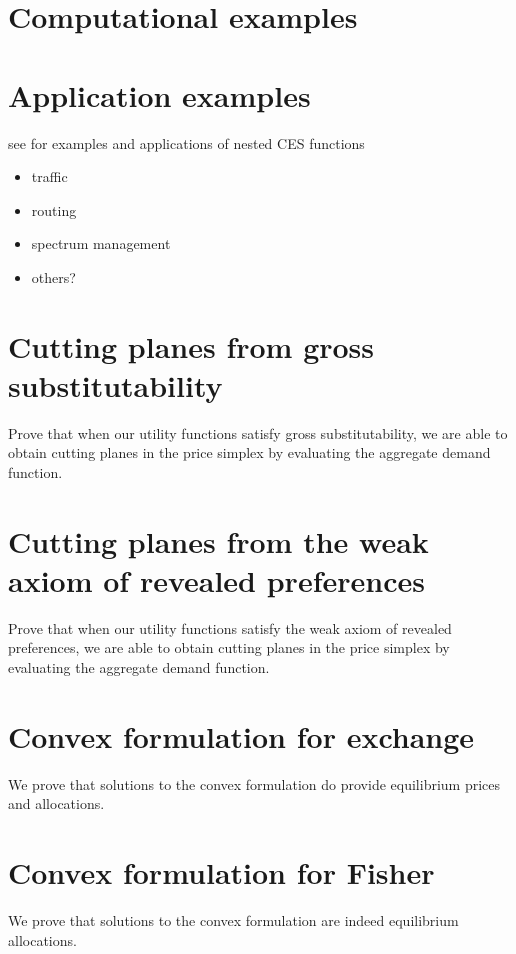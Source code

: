 \documentclass[12pt]{article}
\begin{document}
\section{Computational examples}

\section{Application examples}
\cite{shoven1992applying}

see \cite{shoven1992applying} for examples and applications of nested CES functions

\begin{itemize}
\item traffic
\item routing
\item spectrum management
\item others?
\end{itemize}

\appendix
\section{Cutting planes from gross substitutability}
Prove that when our utility functions satisfy gross substitutability,
we are able to obtain cutting
planes in the price simplex by evaluating the aggregate demand function.

\section{Cutting planes from the weak axiom of revealed preferences}
Prove that when our utility functions satisfy the
weak axiom of revealed preferences, we are able to obtain cutting
planes in the price simplex by evaluating the aggregate demand function.

\section{Convex formulation for exchange}
We prove that solutions to the convex formulation %
do provide equilibrium prices and allocations.

\section{Convex formulation for Fisher}
\label{sec:fisher_proof}
We prove that solutions to the convex formulation %
are indeed equilibrium allocations.

\newpage


\end{document}
